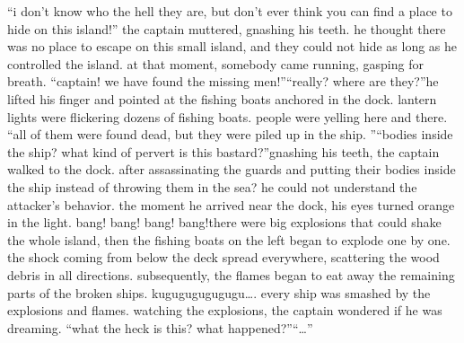 “i don’t know who the hell they are, but don’t ever think you can find a place to hide on this island!” the captain muttered, gnashing his teeth.
he thought there was no place to escape on this small island, and they could not hide as long as he controlled the island.
at that moment, somebody came running, gasping for breath.
“captain! we have found the missing men!”“really? where are they?”he lifted his finger and pointed at the fishing boats anchored in the dock.
lantern lights were flickering dozens of fishing boats.
 people were yelling here and there.
“all of them were found dead, but they were piled up in the ship.
”“bodies inside the ship? what kind of pervert is this bastard?”gnashing his teeth, the captain walked to the dock.
 after assassinating the guards and putting their bodies inside the ship instead of throwing them in the sea? he could not understand the attacker’s behavior.
the moment he arrived near the dock, his eyes turned orange in the light.
bang! bang! bang! bang!there were big explosions that could shake the whole island, then the fishing boats on the left began to explode one by one.
 the shock coming from below the deck spread everywhere, scattering the wood debris in all directions.
 subsequently, the flames began to eat away the remaining parts of the broken ships.
kugugugugugugu….
every ship was smashed by the explosions and flames.
 watching the explosions, the captain wondered if he was dreaming.
“what the heck is this? what happened?”“…”

 